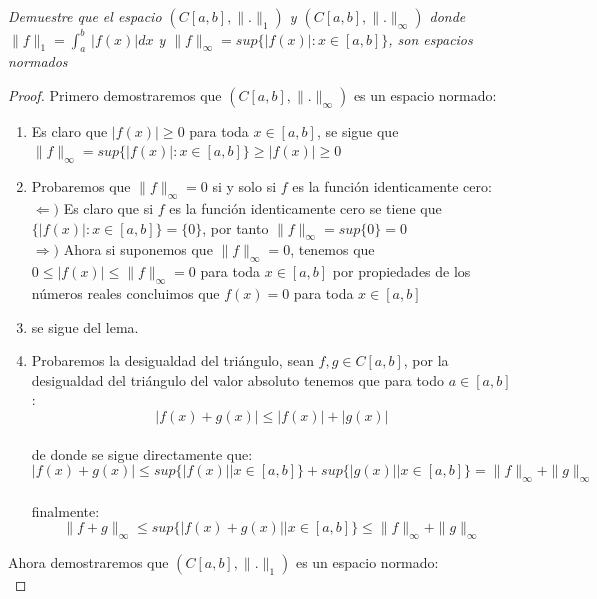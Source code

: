 \documentclass[11pt,letterpaper]{article}
\begin{document}
\begin{tcolorbox}[
	title = \textcolor{black}{\textcolor{white}{Problema 4}},]
\textit{Demuestre que el espacio $(C[a,b],\|.\|_1)$ y $(C[a,b],\|.\|_{\infty})$ donde $\|f\|_1=\int_{a}^{b}\,|f(x)|dx$ y $\|f\|_{\infty}=sup\{|f(x)|:x\in [a,b]\}$, son  espacios normados}
\end{tcolorbox}
\begin{proof}
	Primero demostraremos que $(C[a,b],\|.\|_{\infty})$ es un espacio normado:\,\\
	\begin{enumerate}
		\item Es claro que $|f(x)|\geq 0$ para toda $x\in [a,b]$, se sigue que $\|f\|_{\infty}=sup\{|f(x)|:x\in [a,b]\}\geq|f(x)|\geq 0$
		\item Probaremos que $\|f\|_{\infty}=0$ si y solo si $f$ es la funci\'on identicamente cero:\,\\
		$\Leftarrow)$ Es claro que si $f$ es la funci\'on identicamente cero se tiene que $\{|f(x)|:x\in [a,b]\}=\{0\}$, por tanto $\|f\|_{\infty}=sup\{0\}=0$\,\\
		$\Rightarrow)$ Ahora si suponemos que $\|f\|_{\infty}=0$, tenemos que $0\leq |f(x)|\leq \|f\|_{\infty}=0$ para toda $x\in [a,b]$ por propiedades de los n\'umeros reales concluimos que $f(x)=0$ para toda $x\in [a,b]$
		\item se sigue del lema.
		\item Probaremos la desigualdad del tri\'angulo, sean $f,g\in C[a,b]$, por la desigualdad del tri\'angulo del valor absoluto tenemos que para todo $a\in [a,b]$:\,\\
		\begin{equation*}
			|f(x)+g(x)|\leq |f(x)|+|g(x)|
		\end{equation*}\,\\
		de donde se sigue directamente que:\,\\
		\begin{equation*}
			|f(x)+g(x)|\leq sup\{|f(x)||x\in [a,b]\}+sup\{|g(x)||x\in [a,b]\}=\|f\|_{\infty}+\|g\|_{\infty}
		\end{equation*}\,\\
		finalmente:\,\\
		\begin{equation*}
			\|f+g\|_{\infty}\leq sup\{|f(x)+g(x)||x\in [a,b]\}\leq\|f\|_{\infty}+\|g\|_{\infty}
		\end{equation*}
	\end{enumerate}
	Ahora demostraremos que $(C[a,b],\|.\|_1)$ es un espacio normado:\,\\

\end{proof}
\end{document}

